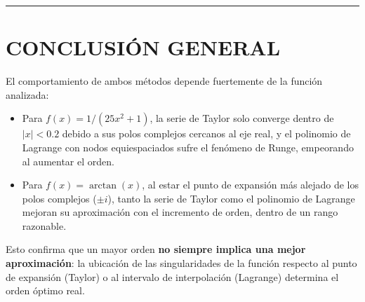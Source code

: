\documentclass[12pt,a4paper]{article}
\begin{document}
\begin{center}
\end{center}

\hrule
\vspace{0.4cm}
\section*{CONCLUSI\'ON GENERAL}

El comportamiento de ambos m\'etodos depende fuertemente de la funci\'on analizada:

\begin{itemize}
  \item Para $f(x)=1/(25x^2+1)$, la serie de Taylor solo converge dentro de $|x|<0.2$ debido a sus polos complejos cercanos al eje real, y el polinomio de Lagrange con nodos equiespaciados sufre el fen\'omeno de Runge, empeorando al aumentar el orden.
  \item Para $f(x)=\arctan(x)$, al estar el punto de expansi\'on m\'as alejado de los polos complejos ($\pm i$), tanto la serie de Taylor como el polinomio de Lagrange mejoran su aproximaci\'on con el incremento de orden, dentro de un rango razonable.
\end{itemize}

Esto confirma que un mayor orden \textbf{no siempre implica una mejor aproximaci\'on}: la ubicaci\'on de las singularidades de la funci\'on respecto al punto de expansi\'on (Taylor) o al intervalo de interpolaci\'on (Lagrange) determina el orden \'optimo real.
\end{document}
